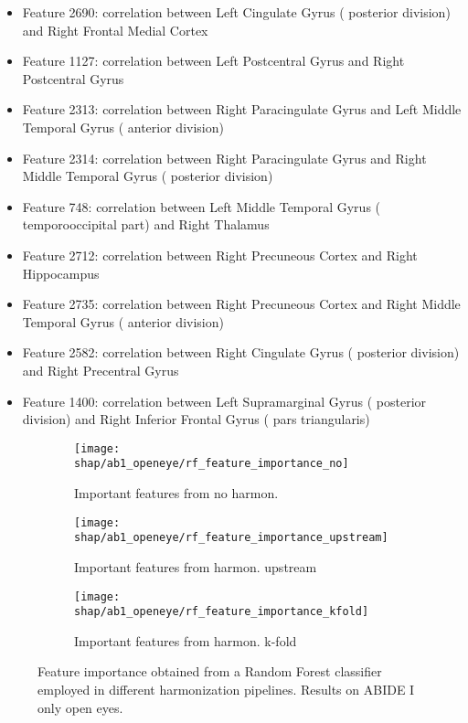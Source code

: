\documentclass[11pt]{report}
\begin{document}
\begin{itemize}
\item Feature 2690: correlation between Left Cingulate Gyrus ( posterior division) and Right Frontal Medial Cortex 
\item Feature 1127: correlation between Left Postcentral Gyrus  and Right Postcentral Gyrus 
\item Feature 2313: correlation between Right Paracingulate Gyrus  and Left Middle Temporal Gyrus ( anterior division)
\item Feature 2314: correlation between Right Paracingulate Gyrus  and Right Middle Temporal Gyrus ( posterior division)
\item Feature 748: correlation between Left Middle Temporal Gyrus ( temporooccipital part) and Right Thalamus 
\item Feature 2712: correlation between Right Precuneous Cortex  and Right Hippocampus 
\item Feature 2735: correlation between Right Precuneous Cortex  and Right Middle Temporal Gyrus ( anterior division)
\item Feature 2582: correlation between Right Cingulate Gyrus ( posterior division) and Right Precentral Gyrus 
\item Feature 1400: correlation between Left Supramarginal Gyrus ( posterior division) and Right Inferior Frontal Gyrus ( pars triangularis)
\end{itemize}


\begin{figure}
\centering
\begin{subfigure}[b]{.45\textwidth}
   \texttt{[image: shap/ab1\_openeye/rf\_feature\_importance\_no]}
   \caption{Important features from no harmon.}
    
\end{subfigure}
\begin{subfigure}[b]{.45\textwidth}
   \texttt{[image: shap/ab1\_openeye/rf\_feature\_importance\_upstream]}
   \caption{Important features from harmon. upstream}
    
\end{subfigure}
\begin{subfigure}[b]{.45\textwidth}
   \texttt{[image: shap/ab1\_openeye/rf\_feature\_importance\_kfold]}
   \caption{Important features from harmon. k-fold}
    
\end{subfigure}
\caption{Feature importance obtained from a Random Forest classifier employed in different harmonization pipelines.
Results on ABIDE I only open eyes.
}
\label{fig:rf_feature_importance_ab1}
\end{figure}
\end{document}
